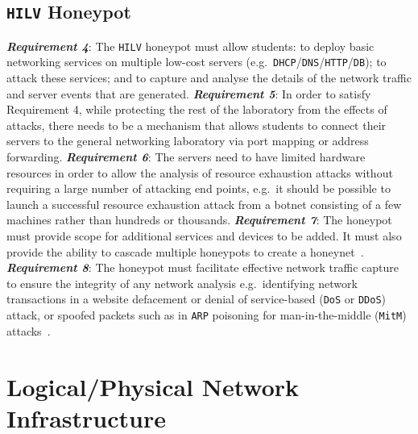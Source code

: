 \documentclass[10pt,journal]{IEEEtran}
\begin{document}
\subsection{\texttt{HILV} Honeypot}\label{subsec:ResearchHoneypot}

\noindent\textit{\textbf{Requirement 4}}:
The \texttt{HILV} honeypot must allow students: to deploy basic networking services
on multiple low-cost servers
(e.g.\ \texttt{DHCP}/\texttt{DNS}/\texttt{HTTP}/\texttt{DB}); to attack these
services; and to capture and analyse the details of the network traffic
and server events that are generated.
\newline\newline
\noindent\textit{\textbf{Requirement 5}}:
In order to satisfy Requirement 4, while protecting the rest of the laboratory
from the effects of attacks, there needs to be a mechanism that allows students
to connect their servers to the general networking laboratory via port mapping
or address forwarding.
\newline\newline
\noindent\textit{\textbf{Requirement 6}}:
The servers need to have limited hardware resources in order to allow the
analysis of resource exhaustion attacks without requiring a large number of
attacking end points, e.g.\ it should be possible to launch a successful
resource exhaustion attack from a botnet consisting of a few machines rather
than hundreds or thousands.
\newline\newline
\noindent\textit{\textbf{Requirement 7}}:
The honeypot must provide scope for additional services and devices to be
added. It must also provide the ability to cascade multiple honeypots to create
a honeynet~\cite{AA:15,FDF:15,KNC:15}.
\newline\newline
\noindent\textit{\textbf{Requirement 8}}:
The honeypot must facilitate effective network traffic capture to ensure the
integrity of any network analysis e.g.\ identifying network transactions in a
website defacement or denial of service-based (\texttt{DoS} or \texttt{DDoS})
attack, or spoofed packets such as in \texttt{ARP} poisoning for
man-in-the-middle (\texttt{MitM}) attacks~\cite{PS:16,RSKA:16}.

\section{Logical/Physical Network Infrastructure}\label{sec:LogicalDesign}
\end{document}
